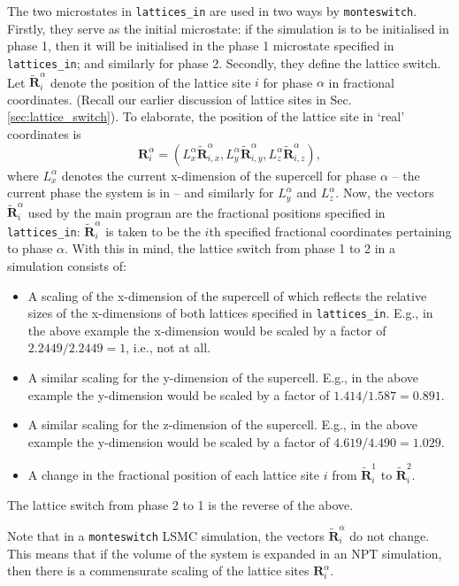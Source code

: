 \documentclass{report}
\begin{document}
The two microstates in \texttt{lattices\_in} are used in two ways by \texttt{monteswitch}. Firstly, they serve as the initial microstate: if the 
simulation is to be initialised in phase 1, then it will be initialised in the phase 1 microstate specified in \texttt{lattices\_in}; and 
similarly for phase 2. Secondly, they define the lattice switch. Let $\tilde{\mathbf{R}}^{\alpha}_i$ denote the position of the lattice site $i$
for phase $\alpha$ in fractional coordinates. (Recall our earlier discussion of lattice sites in Sec. \ref{sec:lattice_switch}). To elaborate,
the position of the lattice site in `real' coordinates is 
\begin{equation}
\mathbf{R}^{\alpha}_i=(L_x^{\alpha}\tilde{\mathbf{R}}^{\alpha}_{i,x},L_y^{\alpha}\tilde{\mathbf{R}}^{\alpha}_{i,y},L_z^{\alpha}\tilde{\mathbf{R}}^{\alpha}_{i,z}),
\end{equation}
where $L_x^{\alpha}$ denotes the current x-dimension of the supercell for phase $\alpha$ -- the current phase the system is in -- and similarly for
$L_y^{\alpha}$ and $L_z^{\alpha}$. Now, the vectors $\tilde{\mathbf{R}}^{\alpha}_i$ used by the main program are the fractional positions specified in 
\texttt{lattices\_in}: $\tilde{\mathbf{R}}^{\alpha}_i$ is taken to be the $i$th specified fractional coordinates pertaining to phase $\alpha$.
With this in mind, the lattice switch from phase 1 to 2 in a simulation consists of:
\begin{itemize}
\item A scaling of the x-dimension of the supercell of which reflects the relative sizes of the x-dimensions of both lattices specified in 
\texttt{lattices\_in}. E.g., in the above example the x-dimension would be scaled by a factor of $2.2449/2.2449=1$, i.e., not at all.
\item A similar scaling for the y-dimension of the supercell. E.g., in the above example the y-dimension would be scaled by a factor of
$1.414/1.587=0.891$.
\item A similar scaling for the z-dimension of the supercell. E.g., in the above example the y-dimension would be scaled by a factor of
$4.619/4.490=1.029$.
\item A change in the fractional position of each lattice site $i$ from $\tilde{\mathbf{R}}^{1}_i$ to $\tilde{\mathbf{R}}^{2}_i$.
\end{itemize}
The lattice switch from phase 2 to 1 is the reverse of the above.

Note that in a \texttt{monteswitch} LSMC simulation, the vectors $\tilde{\mathbf{R}}^{\alpha}_i$ do not change. This means that
if the volume of the system is expanded in an NPT simulation, then there is a commensurate scaling of the lattice sites 
$\mathbf{R}^{\alpha}_i$.
\end{document}
